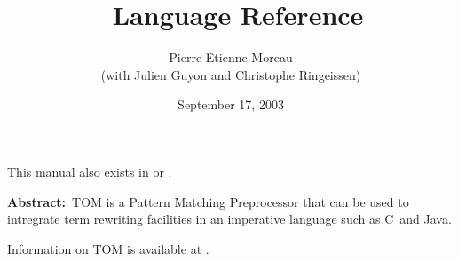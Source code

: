 \documentclass[a4paper]{book}
\title{\TOM\ Language Reference}
\author{Pierre-Etienne Moreau\\(with Julien Guyon and Christophe Ringeissen)}
\date{September 17, 2003}
\newcommand{\Clang}{\textsf{C}}
\newcommand{\Java}{\textsf{Java}}
\begin{document}
\maketitle

\begin{table}[h]
This manual also exists in   or .
\end{table}

\textbf{Abstract:}~TOM is a Pattern Matching Preprocessor that can be used to
intregrate term rewriting facilities in an imperative language such as
\Clang\ and \Java.

Information on TOM is available at .

\tableofcontents

%










\end{document}
